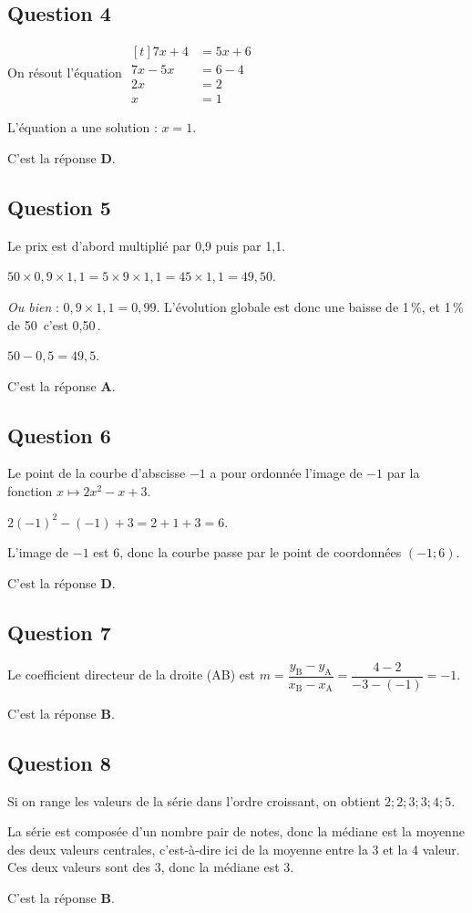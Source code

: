 \documentclass[10pt]{article}
\providecommand{\euro}{\texteuro}
\providecommand{\euro}{{\text{€}}}
\renewcommand{\euro}{\ifmmode\text{\texteuro}\else\texteuro\fi}
\begin{document}
\subsection*{Question 4}
	On résout l'équation $\begin{aligned}[t] 7 x+4 & = 5 x+ 6 \\
	7x-5x &= 6-4\\
	2x &= 2\\
	x &= 1
	\end{aligned}$

	L'équation a une solution : $x = 1$.

	C'est la réponse \textbf{D}.

\subsection*{Question 5}
	Le prix est d'abord multiplié par 0,9 puis par 1,1.

	$50 \times 0,9 \times 1,1= 5 \times 9 \times 1,1 = 45 \times 1,1 = 49,50$.

	\emph{Ou bien} : $0,9\times 1,1= 0,99$. \quad L'évolution globale est donc une baisse de 1\,\%, et 1\,\% de 50\,\euro{} c'est 0,50\,\euro{}.

	$50 - 0,5 = 49,5$.

	C'est la réponse \textbf{A}.

\subsection*{Question 6}
	Le point de la courbe d'abscisse $-1$ a pour ordonnée l'image de $-1$ par la fonction $x \mapsto 2 x^{2}-x+3$.

	$2 (-1)^{2}-(-1)+3=2+1+3=6$.

	L'image de $-1$ est 6, donc la courbe passe par le point de coordonnées $(-1 ; 6)$.

	C'est la réponse \textbf{D}.

\subsection*{Question 7}
	Le coefficient directeur de la droite (AB) est \quad $m=\dfrac{y_{\mathrm{B}}-y_{\mathrm{A}}}{x_{\mathrm{B}}-x_{\mathrm{A}}}=\dfrac{4-2}{-3-(-1)}=-1$.

	C'est la réponse \textbf{B}.

\subsection*{Question 8}
	Si on range les valeurs de la série dans l'ordre croissant, on obtient \quad $2 ; 2 ; 3 ; 3 ; 4 ; 5$.

	La série est composée d'un nombre pair de notes, donc la médiane est la moyenne des deux valeurs centrales, c'est-à-dire ici de la moyenne entre la 3 et la 4 valeur. Ces deux valeurs sont des 3, donc la médiane est 3.

	C'est la réponse \textbf{B}.


\end{document}
